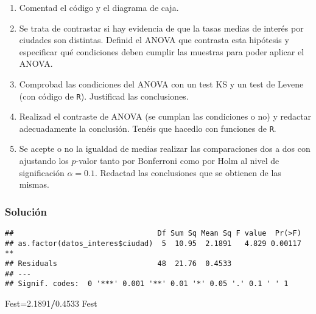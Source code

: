 \documentclass[
]{article}
\newenvironment{Shaded}{\begin{snugshade}}{\end{snugshade}}
\newcommand{\FloatTok}[1]{\textcolor[rgb]{0.00,0.00,0.81}{#1}}
\newcommand{\KeywordTok}[1]{\textcolor[rgb]{0.13,0.29,0.53}{\textbf{#1}}}
\newcommand{\NormalTok}[1]{#1}
\newcommand{\OperatorTok}[1]{\textcolor[rgb]{0.81,0.36,0.00}{\textbf{#1}}}
\providecommand{\tightlist}{%
  \setlength{\itemsep}{0pt}\setlength{\parskip}{0pt}}
\begin{document}
\begin{enumerate}
\def\labelenumi{\arabic{enumi}.}
\tightlist
\item
  Comentad el código y el diagrama de caja.
\item
  Se trata de contrastar si hay evidencia de que la tasas medias de
  interés por ciudades son distintas. Definid el ANOVA que contrasta
  esta hipótesis y especificar qué condiciones deben cumplir las
  muestras para poder aplicar el ANOVA.\\
\item
  Comprobad las condiciones del ANOVA con un test KS y un test de Levene
  (con código de \texttt{R}). Justificad las conclusiones.\\
\item
  Realizad el contraste de ANOVA (se cumplan las condiciones o no) y
  redactar adecuadamente la conclusión. Tenéis que hacedlo con funciones
  de \texttt{R}.\\
\item
  Se acepte o no la igualdad de medias realizar las comparaciones dos a
  dos con ajustando los \(p\)-valor tanto por Bonferroni como por Holm
  al nivel de significación \(\alpha=0.1\). Redactad las conclusiones
  que se obtienen de las mismas.
\end{enumerate}

\hypertarget{soluciuxf3n}{%
\subsubsection{Solución}\label{soluciuxf3n}}

\begin{Shaded}
\end{Shaded}

\begin{verbatim}
##                                 Df Sum Sq Mean Sq F value  Pr(>F)   
## as.factor(datos_interes$ciudad)  5  10.95  2.1891   4.829 0.00117 **
## Residuals                       48  21.76  0.4533                   
## ---
## Signif. codes:  0 '***' 0.001 '**' 0.01 '*' 0.05 '.' 0.1 ' ' 1
\end{verbatim}

\begin{Shaded}
\begin{Highlighting}[]
\NormalTok{Fest=}\FloatTok{2.1891}\OperatorTok{/}\FloatTok{0.4533}
\NormalTok{Fest}
\end{Highlighting}
\end{Shaded}
\end{document}

